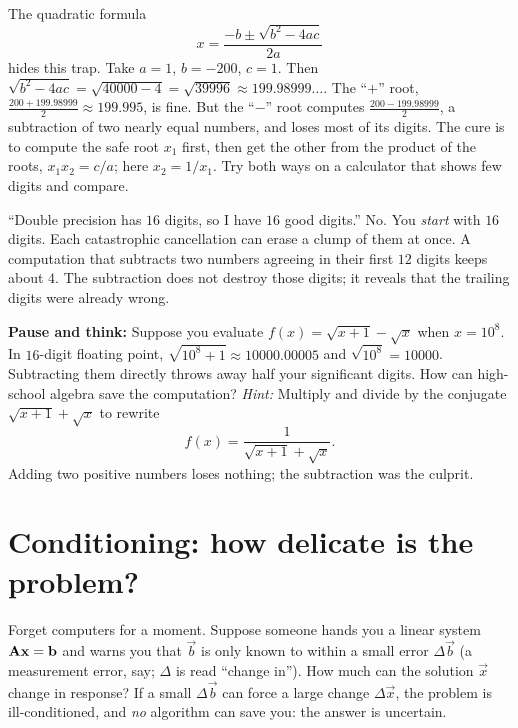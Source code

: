 \begin{labbox}
The quadratic formula
\[
  x = \frac{-b \pm \sqrt{b^2-4ac}}{2a}
\]
hides this trap. Take $a=1$, $b=-200$, $c=1$. Then
$\sqrt{b^2-4ac}=\sqrt{40000-4}=\sqrt{39996}\approx 199.98999\ldots$. The ``$+$'' root,
$\tfrac{200+199.98999}{2}\approx 199.995$, is fine. But the ``$-$'' root computes
$\tfrac{200-199.98999}{2}$, a subtraction of two nearly equal numbers, and loses most of
its digits. The cure is to compute the safe root $x_1$ first, then get the other from
the product of the roots, $x_1 x_2 = c/a$; here $x_2 = 1/x_1$. Try both ways on a
calculator that shows few digits and compare.
\end{labbox}

\begin{trapbox}
``Double precision has $16$ digits, so I have $16$ good digits.'' No. You \emph{start}
with $16$ digits. Each catastrophic cancellation can erase a clump of them at once. A
computation that subtracts two numbers agreeing in their first $12$ digits keeps about
$4$. The subtraction does not destroy those digits; it reveals that the trailing digits
were already wrong.
\end{trapbox}

\begin{recoverybox}
\textbf{Pause and think:} Suppose you evaluate $f(x) = \sqrt{x+1} - \sqrt{x}$ when
$x = 10^8$. In $16$-digit floating point, $\sqrt{10^8+1} \approx 10000.00005$ and
$\sqrt{10^8} = 10000$. Subtracting them directly throws away half your significant
digits. How can high-school algebra save the computation?
\emph{Hint:} Multiply and divide by the conjugate $\sqrt{x+1}+\sqrt{x}$ to rewrite
\[
  f(x) = \frac{1}{\sqrt{x+1} + \sqrt{x}}.
\]
Adding two positive numbers loses nothing; the subtraction was the culprit.
\end{recoverybox}

\section{Conditioning: how delicate is the problem?}

Forget computers for a moment. Suppose someone hands you a linear system
$\mathbf{A}\mathbf{x}=\mathbf{b}$ and warns you that $\vec{b}$ is only known to within a small
error $\Delta\vec{b}$ (a measurement error, say; $\Delta$ is read ``change in''). How
much can the solution $\vec{x}$ change in response? If a small $\Delta\vec{b}$ can force
a large change $\Delta\vec{x}$, the problem is ill-conditioned, and \emph{no} algorithm
can save you: the answer is uncertain.

